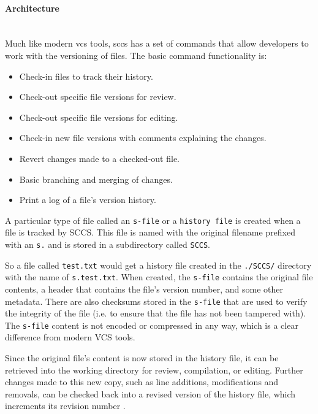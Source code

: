 \paragraph{Architecture}
\hfill\medskip\\
Much like modern \acrshort{vcs} tools, \acrshort{sccs} has a set of commands that allow developers to work with the versioning of files. The basic command functionality is:
\begin{itemize}
    \item Check-in files to track their history.
    \item Check-out specific file versions for review.
    \item Check-out specific file versions for editing.
    \item Check-in new file versions with comments explaining the changes.
    \item Revert changes made to a checked-out file.
    \item Basic branching and merging of changes.
    \item Print a log of a file's version history.
\end{itemize}
A particular type of file called an \lstinline{s-file} or a \lstinline{history file} is created when a file is tracked by SCCS. This file is named with the original filename prefixed with an \lstinline{s.} and is stored in a subdirectory called \lstinline{SCCS}.
\smallskip

So a file called \lstinline{test.txt} would get a history file created in the \lstinline{./SCCS/} directory with the name of \lstinline{s.test.txt}. When created, the \lstinline{s-file} contains the original file contents, a header that contains the file's version number, and some other metadata. There are also checksums stored in the \lstinline{s-file} that are used to verify the integrity of the file (i.e. to ensure that the file has not been tampered with). The \lstinline{s-file} content is not encoded or compressed in any way, which is a clear difference from modern VCS tools.
\smallskip

Since the original file's content is now stored in the history file, it can be retrieved into the working directory for review, compilation, or editing. Further changes made to this new copy, such as line additions, modifications and removals, can be checked back into a revised version of the history file, which increments its revision number \cite{stopak_2019}.
\smallskip

